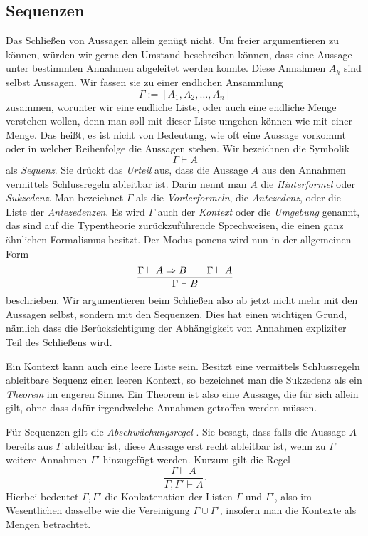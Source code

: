 \subsection{Sequenzen}

Das Schließen von Aussagen allein genügt nicht. Um freier argumentieren
zu können, würden wir gerne den Umstand beschreiben können, dass eine
Aussage unter bestimmten Annahmen abgeleitet werden konnte. Diese
Annahmen $A_k$ sind selbst Aussagen. Wir fassen sie zu einer endlichen
Ansammlung
\[\Gamma := [A_1,A_2,\ldots,A_n]\]
zusammen, worunter wir eine endliche Liste, oder auch eine endliche
Menge verstehen wollen, denn man soll mit dieser Liste umgehen können
wie mit einer Menge. Das heißt, es ist nicht von Bedeutung, wie
oft eine Aussage vorkommt oder in welcher Reihenfolge die Aussagen
stehen. Wir bezeichnen die Symbolik
\[\Gamma\vdash A\]
als \emph{Sequenz}. Sie drückt das \emph{Urteil}%
 aus, dass die Aussage $A$ aus den Annahmen
vermittels Schlussregeln ableitbar ist. Darin nennt man $A$ die
\emph{Hinterformel} oder \emph{Sukzedenz}. Man bezeichnet $\Gamma$ als
die \emph{Vorderformeln}, die \emph{Antezedenz},
 oder die Liste der \emph{Antezedenzen}. Es wird
$\Gamma$ auch der \emph{Kontext}
oder die \emph{Umgebung} genannt, das sind auf die
Typentheorie zurückzuführende Sprechweisen, die einen ganz ähnlichen
Formalismus besitzt.
Der Modus ponens wird nun in der allgemeinen Form
\[\dfrac{\Gamma\vdash A\Rightarrow B\qquad\Gamma\vdash A}{\Gamma\vdash B}\]
beschrieben. Wir argumentieren beim Schließen also ab jetzt nicht mehr
mit den Aussagen selbst, sondern mit den Sequenzen. Dies hat einen wichtigen
Grund, nämlich dass die Berücksichtigung der Abhängigkeit von Annahmen
expliziter Teil des Schließens wird.

Ein Kontext kann auch eine leere Liste sein. Besitzt eine vermittels
Schlussregeln ableitbare Sequenz einen leeren Kontext, so bezeichnet
man die Sukzedenz als ein \emph{Theorem} im engeren
Sinne. Ein Theorem ist also eine Aussage, die für sich allein gilt,
ohne dass dafür irgendwelche Annahmen getroffen werden müssen.

Für Sequenzen gilt die \emph{Abschwächungsregel}%
. Sie besagt, dass
falls die Aussage $A$ bereits aus $\Gamma$ ableitbar ist, diese
Aussage erst recht ableitbar ist, wenn zu $\Gamma$ weitere Annahmen
$\Gamma'$ hinzugefügt werden. Kurzum gilt die Regel
\[\dfrac{\Gamma\vdash A}{\Gamma,\Gamma'\vdash A}.\]
Hierbei bedeutet $\Gamma,\Gamma'$ die Konkatenation der Listen
$\Gamma$ und $\Gamma'$, also im Wesentlichen dasselbe wie die
Vereinigung $\Gamma\cup\Gamma'$, insofern man die Kontexte als
Mengen betrachtet.

